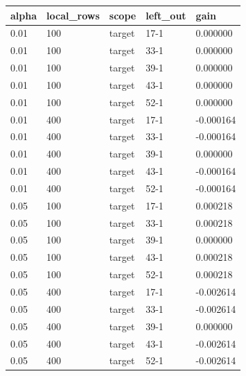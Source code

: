 \begin{tabular}{lllll}
\toprule
alpha & local\_rows & scope & left\_out & gain \\
\midrule
0.01 & 100 & target & 17-1 & 0.000000 \\
0.01 & 100 & target & 33-1 & 0.000000 \\
0.01 & 100 & target & 39-1 & 0.000000 \\
0.01 & 100 & target & 43-1 & 0.000000 \\
0.01 & 100 & target & 52-1 & 0.000000 \\
0.01 & 400 & target & 17-1 & -0.000164 \\
0.01 & 400 & target & 33-1 & -0.000164 \\
0.01 & 400 & target & 39-1 & 0.000000 \\
0.01 & 400 & target & 43-1 & -0.000164 \\
0.01 & 400 & target & 52-1 & -0.000164 \\
0.05 & 100 & target & 17-1 & 0.000218 \\
0.05 & 100 & target & 33-1 & 0.000218 \\
0.05 & 100 & target & 39-1 & 0.000000 \\
0.05 & 100 & target & 43-1 & 0.000218 \\
0.05 & 100 & target & 52-1 & 0.000218 \\
0.05 & 400 & target & 17-1 & -0.002614 \\
0.05 & 400 & target & 33-1 & -0.002614 \\
0.05 & 400 & target & 39-1 & 0.000000 \\
0.05 & 400 & target & 43-1 & -0.002614 \\
0.05 & 400 & target & 52-1 & -0.002614 \\
\bottomrule
\end{tabular}
